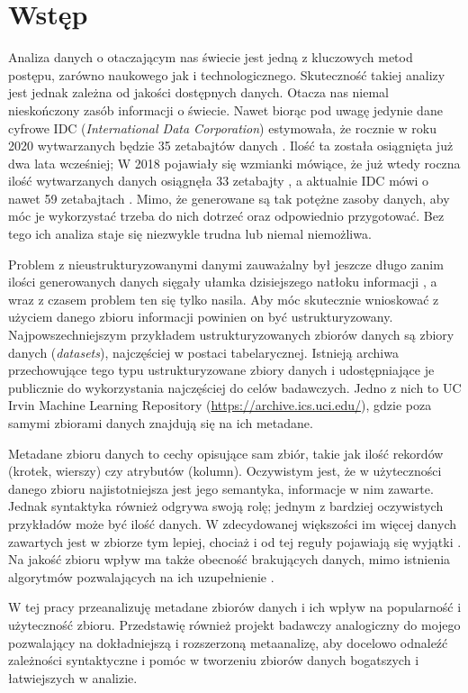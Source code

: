 \chapter{Wstęp}
\label{ch:introduction}

Analiza danych o otaczającym nas świecie jest jedną z kluczowych metod postępu, zarówno naukowego jak i technologicznego.
Skuteczność takiej analizy jest jednak zależna od jakości dostępnych danych.
Otacza nas niemal nieskończony zasób informacji o świecie.
Nawet biorąc pod uwagę jedynie dane cyfrowe IDC (\textit{International Data Corporation}) estymowała, że rocznie w roku 2020 wytwarzanych będzie 35 zetabajtów danych \cite{tien2013big}.
Ilość ta została osiągnięta już dwa lata wcześniej; W 2018 pojawiały się wzmianki mówiące, że już wtedy roczna ilość wytwarzanych danych osiągnęła 33 zetabajty \cite{Patrizio:2018}, a aktualnie IDC mówi o nawet 59 zetabajtach \cite{IDC:2020}.
Mimo, że generowane są tak potężne zasoby danych, aby móc je wykorzystać trzeba do nich dotrzeć oraz odpowiednio przygotować.
Bez tego ich analiza staje się niezwykle trudna lub niemal niemożliwa.

Problem z nieustrukturyzowanymi danymi zauważalny był jeszcze długo zanim ilości generowanych danych sięgały ułamka dzisiejszego natłoku informacji \cite{blumberg2003problem}, a wraz z czasem problem ten się tylko nasila.
Aby móc skutecznie wnioskować z użyciem danego zbioru informacji powinien on być ustrukturyzowany.
Najpowszechniejszym przykładem ustrukturyzowanych zbiorów danych są zbiory danych (\textit{datasets}), najczęściej w postaci tabelarycznej.
Istnieją archiwa przechowujące tego typu ustrukturyzowane zbiory danych i udostępniające je publicznie do wykorzystania najczęściej do celów badawczych.
Jedno z nich to UC Irvin Machine Learning Repository (\url{https://archive.ics.uci.edu/}), gdzie poza samymi zbiorami danych znajdują się na ich metadane.

Metadane zbioru danych to cechy opisujące sam zbiór, takie jak ilość rekordów (krotek, wierszy) czy atrybutów (kolumn).
Oczywistym jest, że w użyteczności danego zbioru najistotniejsza jest jego semantyka, informacje w nim zawarte.
Jednak syntaktyka również odgrywa swoją rolę; jednym z bardziej oczywistych przykładów może być ilość danych.
W zdecydowanej większości im więcej danych zawartych jest w zbiorze tym lepiej, chociaż i od tej reguły pojawiają się wyjątki \cite{gasco2012does,boivin2006more}.
Na jakość zbioru wpływ ma także obecność brakujących danych, mimo istnienia algorytmów pozwalających na ich uzupełnienie \cite{acuna2004treatment}.

W tej pracy przeanalizuję metadane zbiorów danych i ich wpływ na popularność i użyteczność zbioru.
Przedstawię również projekt badawczy analogiczny do mojego pozwalający na dokładniejszą i rozszerzoną metaanalizę, aby docelowo odnaleźć zależności syntaktyczne i pomóc w tworzeniu zbiorów danych bogatszych i łatwiejszych w analizie.